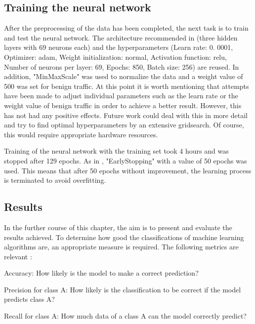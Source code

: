 \documentclass[conference]{IEEEtran}
\begin{document}
\subsection{Training the neural network}
After the preprocessing of the data has been completed, the next task is to train and test the neural network. The architecture recommended in \cite{max1} (three hidden layers with 69 neurons each) and the hyperparameters (Learn rate: 0. 0001, Optimizer: adam, Weight initialization: normal, Activation function: relu, Number of neurons per layer: 69, Epochs: 850, Batch size: 256) are reused. In addition, "MinMaxScale" was used to normalize the data and a weight value of 500 was set for benign traffic. At this point it is worth mentioning that attempts have been made to adjust individual parameters such as the learn rate or the weight value of benign traffic in order to achieve a better result. However, this has not had any positive effects. Future work could deal with this in more detail and try to find optimal hyperparameters by an extensive gridsearch. Of course, this would require appropriate hardware resources.

\smallskip
Training of the neural network with the training set took 4 hours and was stopped after 129 epochs. As in \cite{max1}, "EarlyStopping" with a value of 50 epochs was used. This means that after 50 epochs without improvement, the learning process is terminated to avoid overfitting.

\subsection{Results}
In the further course of this chapter, the aim is to present and evaluate the results achieved. To determine how good the classifications of machine learning algorithms are, an appropriate measure is required. The following metrics are relevant \cite{max3}:
\smallskip 

Accuracy: How likely is the model to make a correct prediction?
\smallskip

Precision for class A: How likely is the classification to be correct if the model predicts class A?
\smallskip

Recall for class A: How much data of a class A can the model correctly predict?
\smallskip
\end{document}
